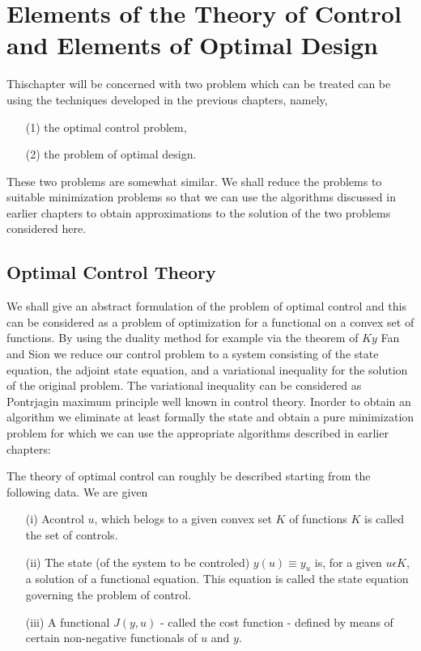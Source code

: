 
\chapter[Elements of the Theory of Control and...]{Elements of the
  Theory of Control and Elements of Optimal Design}\label{chap6} 

This\pageoriginale chapter will be concerned with two problem which
can be treated can be using the techniques developed in the previous
chapters, namely, 
\begin{enumerate}
\item[(1)] the optimal control problem,

\item[(2)] the problem of optimal design.
\end{enumerate}

These two problems are somewhat similar. We shall reduce the problems
to suitable minimization problems so that we can use the algorithms
discussed in earlier chapters to obtain approximations to the solution
of the two problems considered here. 

\section{Optimal Control Theory}\label{chap6-sec1}

We shall give an abstract formulation of the problem of optimal
control and this can be considered as a problem of optimization for a
functional on a convex set of functions. By using the duality method
for example via the theorem of $Ky$ Fan and Sion we reduce our control
problem to a system consisting of the state equation, the adjoint
state equation, and a variational inequality for the solution of the
original problem. The variational inequality can be considered as
Pontrjagin maximum principle well known in control theory. Inorder to
obtain an algorithm we eliminate at least formally the state and
obtain a pure minimization problem for which we can use the
appropriate algorithms described in earlier chapters: 

The theory of optimal control can roughly be described starting from the following data. We are given
\begin{enumerate}
\item[(i)] A\pageoriginale control $u$, which belogs to a given convex set $K$ of functions $K$ is called the set of controls.

\item[(ii)] The state (of the system to be controled) $y(u) \equiv y_{u}$ is, for a given $u \epsilon K$, a solution of a functional equation. This equation is called the state equation governing the problem of control.

\item[(iii)] A functional $J(y, u)$ - called the cost function - defined by means of certain non-negative functionals of $u$ and $y$.
\end{enumerate}

